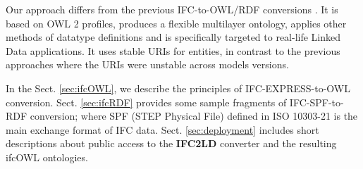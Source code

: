 

Our approach differs from the previous IFC-to-OWL/RDF conversions
\cite{beetz2005ontology,beetz2009ifcowl,pauwels2011interoperability}. It
is based on OWL 2 profiles, produces a flexible multilayer ontology, applies other methods of data\-type definitions and is specifically targeted to
real-life Linked Data applications. It uses stable URIs for entities, in contrast to the previous approaches
where the URIs were unstable across models versions.




In the Sect. \ref{sec:ifcOWL}, we describe the principles of IFC-EXPRESS-to-OWL conversion. Sect. \ref{sec:ifcRDF} provides some sample fragments of IFC-SPF-to-RDF conversion; where SPF (STEP Physical File) defined in ISO 10303-21 \cite{ISO10303-21} is the main exchange format of IFC data. Sect. \ref{sec:deployment} includes short descriptions about public access to the \textbf{IFC2LD} converter and the resulting ifcOWL ontologies.